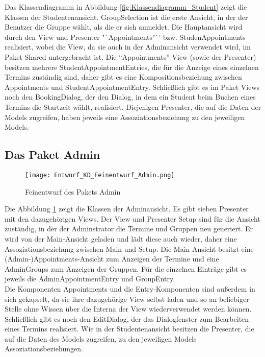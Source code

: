 Das Klassendiagramm in Abbildung \ref{fig:Klassendiagramm_Student} zeigt die Klassen der Studentenansicht.
GroupSelection ist die erste Ansicht, in der der Benutzer die Gruppe wählt, als die er sich anmeldet.
Die Hauptansicht wird durch den View und Presenter "`Appointments"`' bzw. StudenAppointments realisiert, wobei die View, da sie auch in der Adminansicht verwendet wird, im Paket Shared untergebracht ist.
Die "`Appointments"'-View (sowie der Presenter) besitzen mehrere StudentAppointmentEntries, die für die Anzeige eines einzelnen Termins zuständig sind, daher gibt es eine Kompositionsbeziehung zwischen Appointments und StudentAppointmentEntry.
Schließlich gibt es im Paket Views noch den BookingDialog, der den Dialog, in dem ein Student beim Buchen eines Termins die Startzeit wählt, realisiert.
Diejenigen Presenter, die auf die Daten der Models zugreifen, haben jeweils eine Assoziationsbeziehung zu den jeweiligen Models.

 \subsection{Das Paket Admin}
 \begin{figure}
  \texttt{[image: Entwurf\_KD\_Feinentwurf\_Admin.png]}
  \label{fig:Klassendiagramm_Admin}
  \caption{Feinentwurf des Pakets Admin}
 \end{figure}

 Die Abbildung \ref{fig:Klassendiagramm_Admin} zeigt die Klassen der Adminansicht. Es gibt sieben Presenter mit den dazugehörigen Views.
 Der View und Presenter Setup sind für die Ansicht zuständig, in der der Adminstrator die Termine und Gruppen neu generiert. Er wird von der Main-Ansicht geladen und lädt diese auch wieder, daher eine Assoziationsbeziehung zwischen Main und Setup.
 Die Main-Ansicht besitzt eine (Admin-)Appointments-Ansicht zum Anzeigen der Termine und eine AdminGroups zum Anzeigen der Gruppen.
 Für die einzelnen Einträge gibt es jeweils die AdminAppointmentEntry und GroupEntry. \\
 Die Komponenten Appointments und die Entry-Komponenten sind außerdem in sich gekapselt, da sie ihre dazugehörige View selbst laden und so an beliebiger Stelle ohne Wissen über die Interna der View wiederverwendet werden können. \\
 Schließlich gibt es noch den EditDialog, der das Dialogfenster zum Bearbeiten eines Termins realisiert.
 Wie in der Studentenansicht besitzen die Presenter, die auf die Daten des Models zugreifen, zu den jeweiligen Models Assoziationsbeziehungen.

